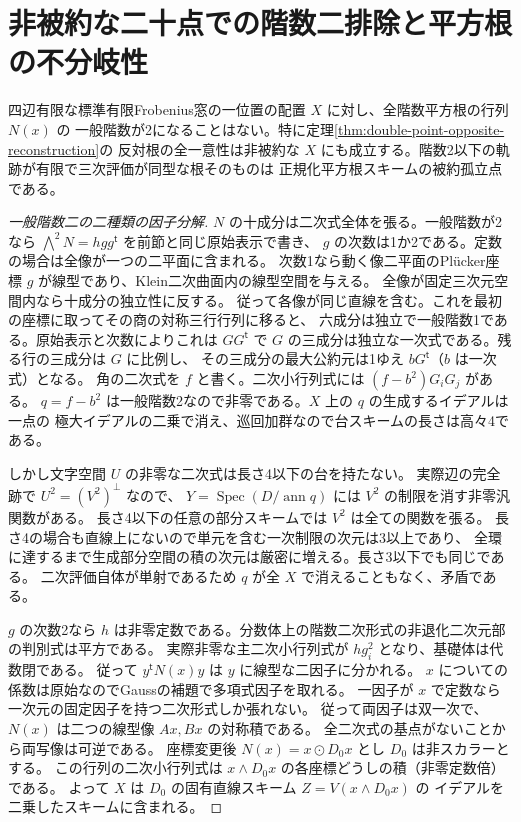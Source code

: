 \section{非被約な二十点での階数二排除と平方根の不分岐性}
\label{sec:nonreduced-opposite-root-separation}
\begin{theorem}\label{thm:nonreduced-opposite-root-separation}
四辺有限な標準有限Frobenius窓の一位置の配置 $X$ に対し、全階数平方根の行列 $N(x)$ の
一般階数が2になることはない。特に定理\ref{thm:double-point-opposite-reconstruction}の
反対根の全一意性は非被約な $X$ にも成立する。階数2以下の軌跡が有限で三次評価が同型な根そのものは
正規化平方根スキームの被約孤立点である。
\end{theorem}
\begin{proof}[一般階数二の二種類の因子分解]
$N$ の十成分は二次式全体を張る。一般階数が2なら
$\bigwedge^2N=hgg^{\mathsf t}$ を前節と同じ原始表示で書き、
$g$ の次数は1か2である。定数の場合は全像が一つの二平面に含まれる。
次数1なら動く像二平面のPl\"ucker座標 $g$ が線型であり、Klein二次曲面内の線型空間を与える。
全像が固定三次元空間内なら十成分の独立性に反する。
従って各像が同じ直線を含む。これを最初の座標に取ってその商の対称三行行列に移ると、
六成分は独立で一般階数1である。原始表示と次数によりこれは $G G^{\mathsf t}$ で
$G$ の三成分は独立な一次式である。残る行の三成分は $G$ に比例し、
その三成分の最大公約元は1ゆえ $bG^{\mathsf t}$（$b$ は一次式）となる。
角の二次式を $f$ と書く。二次小行列式には $(f-b^2)G_iG_j$ がある。
$q=f-b^2$ は一般階数2なので非零である。$X$ 上の $q$ の生成するイデアルは一点の
極大イデアルの二乗で消え、巡回加群なので台スキームの長さは高々4である。

しかし文字空間 $U$ の非零な二次式は長さ4以下の台を持たない。
実際辺の完全跡で $U^2=(V^2)^\perp$ なので、
$Y=\operatorname{Spec}(D/\operatorname{ann} q)$ には $V^2$ の制限を消す非零汎関数がある。
長さ4以下の任意の部分スキームでは $V^2$ は全ての関数を張る。
長さ4の場合も直線上にないので単元を含む一次制限の次元は3以上であり、
全環に達するまで生成部分空間の積の次元は厳密に増える。長さ3以下でも同じである。
二次評価自体が単射であるため $q$ が全 $X$ で消えることもなく、矛盾である。

$g$ の次数2なら $h$ は非零定数である。分数体上の階数二次形式の非退化二次元部の判別式は平方である。
実際非零な主二次小行列式が $h g_i^2$ となり、基礎体は代数閉である。
従って $y^{\mathsf t}N(x)y$ は $y$ に線型な二因子に分かれる。
$x$ についての係数は原始なのでGaussの補題で多項式因子を取れる。
一因子が $x$ で定数なら一次元の固定因子を持つ二次形式しか張れない。
従って両因子は双一次で、$N(x)$ は二つの線型像 $Ax,Bx$ の対称積である。
全二次式の基点がないことから両写像は可逆である。
座標変更後 $N(x)=x\mathbin{\odot}D_0x$ とし $D_0$ は非スカラーとする。
この行列の二次小行列式は $x\wedge D_0x$ の各座標どうしの積（非零定数倍）である。
よって $X$ は $D_0$ の固有直線スキーム $Z=V(x\wedge D_0x)$ の
イデアルを二乗したスキームに含まれる。
\end{proof}

